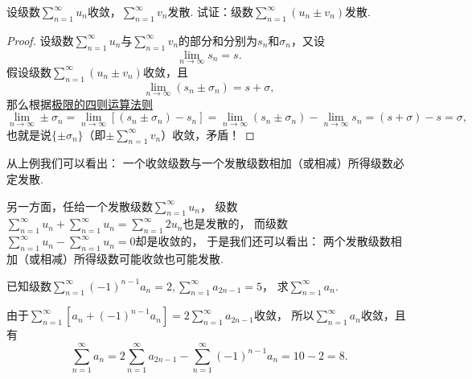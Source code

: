\begin{example}
设级数\(\sum\limits_{n=1}^\infty u_n\)收敛，\(\sum\limits_{n=1}^\infty v_n\)发散.
试证：级数\(\sum\limits_{n=1}^\infty (u_n \pm v_n)\)发散.
\begin{proof}
设级数\(\sum\limits_{n=1}^\infty u_n\)与\(\sum\limits_{n=1}^\infty v_n\)的部分和分别为\(s_n\)和\(\sigma_n\)，又设\[
\lim\limits_{n\to\infty} s_n = s.
\]
假设级数\(\sum\limits_{n=1}^\infty (u_n \pm v_n)\)收敛，且\[
\lim\limits_{n\to\infty} (s_n \pm \sigma_n) = s+\sigma,
\]那么根据\hyperref[theorem:极限.极限的四则运算法则]{极限的四则运算法则}\[
\lim\limits_{n\to\infty} \pm\sigma_n
= \lim\limits_{n\to\infty} [(s_n \pm \sigma_n) - s_n]
= \lim\limits_{n\to\infty} (s_n \pm \sigma_n) - \lim\limits_{n\to\infty} s_n
= (s + \sigma) - s
= \sigma,
\]也就是说\(\{\pm\sigma_n\}\)（即\(\pm\sum\limits_{n=1}^\infty v_n\)）收敛，矛盾！
\end{proof}
\end{example}
从上例我们可以看出：
{\color{red}一个收敛级数与一个发散级数相加（或相减）所得级数必定发散.}

另一方面，任给一个发散级数\(\sum\limits_{n=1}^\infty u_n\)，
级数\(\sum\limits_{n=1}^\infty u_n + \sum\limits_{n=1}^\infty u_n
= \sum\limits_{n=1}^\infty 2 u_n\)也是发散的，
而级数\(\sum\limits_{n=1}^\infty u_n - \sum\limits_{n=1}^\infty u_n
= 0\)却是收敛的，
于是我们还可以看出：
{\color{red}两个发散级数相加（或相减）所得级数可能收敛也可能发散.}

\begin{example}
已知级数\(\sum\limits_{n=1}^\infty (-1)^{n-1} a_n = 2,
\sum\limits_{n=1}^\infty a_{2n-1} = 5\)，
求\(\sum\limits_{n=1}^\infty a_n\).
\begin{solution}
由于\(\sum\limits_{n=1}^\infty [a_n + (-1)^{n-1} a_n]
= 2 \sum\limits_{n=1}^\infty a_{2n-1}\)收敛，
所以\(\sum\limits_{n=1}^\infty a_n\)收敛，且有
\[
\sum\limits_{n=1}^\infty a_n
= 2 \sum\limits_{n=1}^\infty a_{2n-1}
- \sum\limits_{n=1}^\infty (-1)^{n-1} a_n
= 10 - 2 = 8.
\]
\end{solution}
\end{example}


